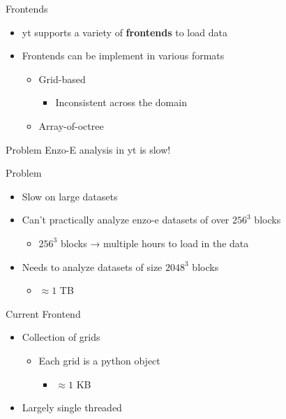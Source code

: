 \documentclass[
  ignorenonframetext,
]{beamer}
\providecommand{\tightlist}{%
  \setlength{\itemsep}{0pt}\setlength{\parskip}{0pt}}
\begin{document}
\begin{frame}{Frontends}
\protect\hypertarget{frontends}{}
\begin{itemize}
\tightlist
\item
  yt supports a variety of \textbf{frontends} to load data
\item
  Frontends can be implement in various formats

  \begin{itemize}
  \tightlist
  \item
    Grid-based

    \begin{itemize}
    \tightlist
    \item
      Inconsistent across the domain
    \end{itemize}
  \item
    Array-of-octree
  \end{itemize}
\end{itemize}
\end{frame}

\begin{frame}{Problem}
\protect\hypertarget{problem}{}
Enzo-E analysis in yt is slow!
\end{frame}

\begin{frame}{Problem}
\protect\hypertarget{problem-1}{}
\begin{itemize}
\tightlist
\item
  Slow on large datasets
\item
  Can't practically analyze enzo-e datasets of over \(256^3\) blocks

  \begin{itemize}
  \tightlist
  \item
    \(256^3\) blocks → multiple hours to load in the data
  \end{itemize}
\item
  Needs to analyze datasets of size \(2048^3\) blocks

  \begin{itemize}
  \tightlist
  \item
    \(\approx 1\) TB
  \end{itemize}
\end{itemize}
\end{frame}

\begin{frame}{Current Frontend}
\protect\hypertarget{current-frontend}{}
\begin{itemize}
\tightlist
\item
  Collection of grids

  \begin{itemize}
  \tightlist
  \item
    Each grid is a python object

    \begin{itemize}
    \tightlist
    \item
      \(\approx 1\) KB
    \end{itemize}
  \end{itemize}
\item
  Largely single threaded
\end{itemize}
\end{frame}
\end{document}
